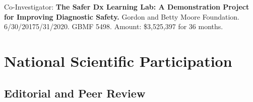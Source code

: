 \documentclass[10pt]{article}
\begin{document}
Co-Investigator: \textbf{The Safer Dx Learning Lab: A Demonstration
  Project for Improving Diagnostic Safety.} Gordon and Betty Moore
Foundation. 6/30/2017\ndash{}5/31/2020. GBMF 5498. Amount: \$3,525,397
for 36 months.



\section{National Scientific Participation}

\subsection{Editorial and Peer Review}  %

\end{document}

